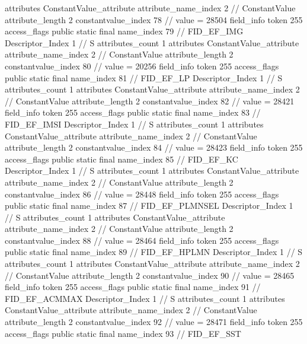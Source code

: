 {{{{{				attributes {
				ConstantValue_attribute {
					attribute_name_index	2		// ConstantValue
					attribute_length	2
					constantvalue_index	78		// value = 28504
				}
				}
			}
			field_info {
				token	255
				access_flags	public static final
				name_index	79		// FID_EF_IMG
				Descriptor_Index	1		// S
				attributes_count	1
				attributes {
				ConstantValue_attribute {
					attribute_name_index	2		// ConstantValue
					attribute_length	2
					constantvalue_index	80		// value = 20256
				}
				}
			}
			field_info {
				token	255
				access_flags	public static final
				name_index	81		// FID_EF_LP
				Descriptor_Index	1		// S
				attributes_count	1
				attributes {
				ConstantValue_attribute {
					attribute_name_index	2		// ConstantValue
					attribute_length	2
					constantvalue_index	82		// value = 28421
				}
				}
			}
			field_info {
				token	255
				access_flags	public static final
				name_index	83		// FID_EF_IMSI
				Descriptor_Index	1		// S
				attributes_count	1
				attributes {
				ConstantValue_attribute {
					attribute_name_index	2		// ConstantValue
					attribute_length	2
					constantvalue_index	84		// value = 28423
				}
				}
			}
			field_info {
				token	255
				access_flags	public static final
				name_index	85		// FID_EF_KC
				Descriptor_Index	1		// S
				attributes_count	1
				attributes {
				ConstantValue_attribute {
					attribute_name_index	2		// ConstantValue
					attribute_length	2
					constantvalue_index	86		// value = 28448
				}
				}
			}
			field_info {
				token	255
				access_flags	public static final
				name_index	87		// FID_EF_PLMNSEL
				Descriptor_Index	1		// S
				attributes_count	1
				attributes {
				ConstantValue_attribute {
					attribute_name_index	2		// ConstantValue
					attribute_length	2
					constantvalue_index	88		// value = 28464
				}
				}
			}
			field_info {
				token	255
				access_flags	public static final
				name_index	89		// FID_EF_HPLMN
				Descriptor_Index	1		// S
				attributes_count	1
				attributes {
				ConstantValue_attribute {
					attribute_name_index	2		// ConstantValue
					attribute_length	2
					constantvalue_index	90		// value = 28465
				}
				}
			}
			field_info {
				token	255
				access_flags	public static final
				name_index	91		// FID_EF_ACMMAX
				Descriptor_Index	1		// S
				attributes_count	1
				attributes {
				ConstantValue_attribute {
					attribute_name_index	2		// ConstantValue
					attribute_length	2
					constantvalue_index	92		// value = 28471
				}
				}
			}
			field_info {
				token	255
				access_flags	public static final
				name_index	93		// FID_EF_SST
}}}}}
